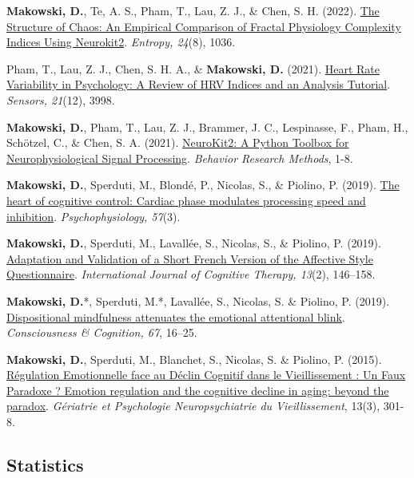\documentclass[11pt,a4paper,]{awesome-cv}
\begin{document}
\textbf{Makowski, D.}, Te, A. S., Pham, T., Lau, Z. J., \& Chen, S. H.
(2022). \href{https://www.mdpi.com/1099-4300/24/8/1036}{The Structure of
Chaos: An Empirical Comparison of Fractal Physiology Complexity Indices
Using Neurokit2}. \emph{Entropy, 24}(8), 1036.

Pham, T., Lau, Z. J., Chen, S. H. A., \& \textbf{Makowski, D.} (2021).
\href{https://www.mdpi.com/1424-8220/21/12/3998}{Heart Rate Variability
in Psychology: A Review of HRV Indices and an Analysis Tutorial}.
\emph{Sensors, 21}(12), 3998.

\textbf{Makowski, D.}, Pham, T., Lau, Z. J., Brammer, J. C., Lespinasse,
F., Pham, H., Schötzel, C., \& Chen, S. A. (2021).
\href{https://dominiquemakowski.github.io/publication/makowski2021neurokit/makowski2021neurokit.pdf}{NeuroKit2:
A Python Toolbox for Neurophysiological Signal Processing}.
\emph{Behavior Research Methods}, 1-8.

\textbf{Makowski, D.}, Sperduti, M., Blondé, P., Nicolas, S., \&
Piolino, P. (2019).
\href{https://dominiquemakowski.github.io/publication/makowski2019heart/makowski2019heart.pdf}{The
heart of cognitive control: Cardiac phase modulates processing speed and
inhibition}. \emph{Psychophysiology, 57}(3).

\textbf{Makowski, D.}, Sperduti, M., Lavallée, S., Nicolas, S., \&
Piolino, P. (2019).
\href{https://dominiquemakowski.github.io/publication/makowski2019adaptation/makowski2019adaptation.pdf}{Adaptation
and Validation of a Short French Version of the Affective Style
Questionnaire}. \emph{International Journal of Cognitive Therapy,
13}(2), 146--158.

\textbf{Makowski, D.}*, Sperduti, M.*, Lavallée, S., Nicolas, S. \&
Piolino, P. (2019).
\href{https://dominiquemakowski.github.io/publication/makowski2019dispositional/makowski2019dispositional.pdf}{Dispositional
mindfulness attenuates the emotional attentional blink}.
\emph{Consciousness \& Cognition, 67}, 16--25.

\textbf{Makowski, D.}, Sperduti, M., Blanchet, S., Nicolas, S. \&
Piolino, P. (2015).
\href{https://dominiquemakowski.github.io/publication/makowski2015emotion/makowski2015emotion.pdf}{Régulation
Emotionnelle face au Déclin Cognitif dans le Vieillissement : Un Faux
Paradoxe ? \textbar{} Emotion regulation and the cognitive decline in
aging: beyond the paradox}. \emph{Gériatrie et Psychologie
Neuropsychiatrie du Vieillissement}, 13(3), 301-8.

\normalsize

\subsection{Statistics}\label{statistics}
\end{document}
